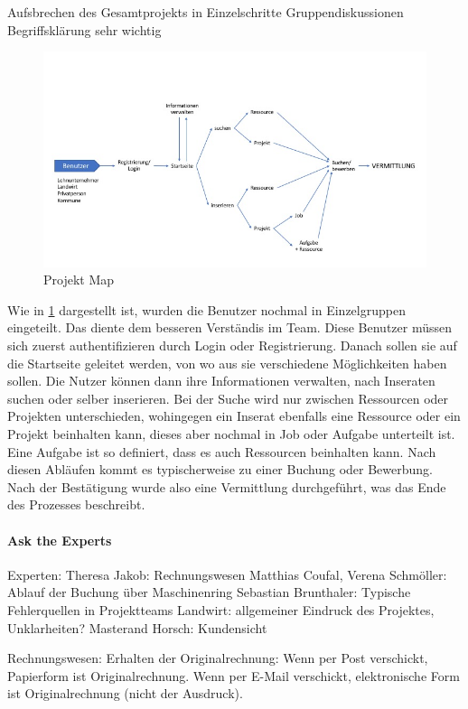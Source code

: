 Aufsbrechen des Gesamtprojekts in Einzelschritte
Gruppendiskussionen
Begriffsklärung sehr wichtig
\begin{figure}[h!]
	\includegraphics[width=\textwidth]{99_IMG/03_Sprint/map}
	\caption{Projekt Map}
	\label{fig:map}
\end{figure}

Wie in \ref{fig:map} dargestellt ist, wurden die Benutzer nochmal in Einzelgruppen eingeteilt. Das diente dem besseren Verständis im Team. Diese Benutzer müssen sich zuerst authentifizieren durch Login oder Registrierung. Danach sollen sie auf die Startseite geleitet werden, von wo aus sie verschiedene Möglichkeiten haben sollen. Die Nutzer können dann ihre Informationen verwalten, nach Inseraten suchen oder selber inserieren. Bei der Suche wird nur zwischen Ressourcen oder Projekten unterschieden, wohingegen ein Inserat ebenfalls eine Ressource oder ein Projekt beinhalten kann, dieses aber nochmal in Job oder Aufgabe unterteilt ist. Eine Aufgabe ist so definiert, dass es auch Ressourcen beinhalten kann. Nach diesen Abläufen kommt es typischerweise zu einer Buchung oder Bewerbung. Nach der Bestätigung wurde also eine Vermittlung durchgeführt, was das Ende des Prozesses beschreibt.

\paragraph{Ask the Experts}
Experten:
Theresa Jakob: Rechnungswesen
Matthias Coufal, Verena Schmöller: Ablauf der Buchung über Maschinenring
Sebastian Brunthaler: Typische Fehlerquellen in Projektteams
Landwirt: allgemeiner Eindruck des Projektes, Unklarheiten?
Masterand Horsch: Kundensicht

Rechnungswesen: 
Erhalten der Originalrechnung: Wenn per Post verschickt, Papierform ist Originalrechnung. Wenn per E-Mail verschickt, elektronische Form ist Originalrechnung (nicht der Ausdruck). 


